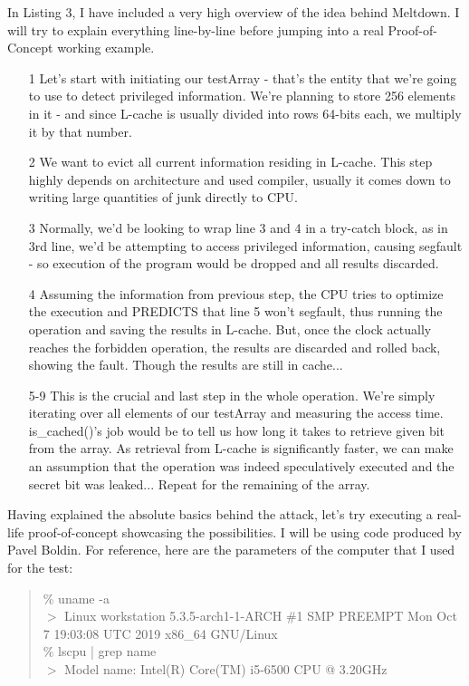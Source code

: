 \documentclass{article}
\begin{document}
In Listing 3, I have included a very high overview of the idea behind Meltdown. I will try to explain everything line-by-line before jumping into a real Proof-of-Concept working example.
\begin{enumerate}

  \item [1] Let's start with initiating our testArray - that's the entity that we're going to use to detect privileged information. We're planning to store 256 elements in it - and since L-cache is usually divided into rows 64-bits each, we multiply it by that number. 
  \item [2] We want to evict all current information residing in L-cache. This step highly depends on architecture and used compiler, usually it comes down to writing large quantities of junk directly to CPU.
  \item [3] Normally, we'd be looking to wrap line 3 and 4 in a try-catch block, as in 3rd line, we'd be attempting to access privileged information, causing segfault - so execution of the program would be dropped and all results discarded.
  \item [4] Assuming the information from previous step, the CPU tries to optimize the execution and PREDICTS that line 5 won't segfault, thus running the operation and saving the results in L-cache. But, once the clock actually reaches the forbidden operation, the results are discarded and rolled back, showing the fault. Though the results are still in cache...
  \item [5-9] This is the crucial and last step in the whole operation. We're simply iterating over all elements of our testArray and measuring the access time. is\_cached()'s job would be to tell us how long it takes to retrieve given bit from the array. As retrieval from L-cache is significantly faster, we can make an assumption that the operation was indeed speculatively executed and the secret bit was leaked... Repeat for the remaining of the array.

\end{enumerate}

Having explained the absolute basics behind the attack, let's try executing a real-life proof-of-concept showcasing the possibilities. I will be using code produced by Pavel Boldin\cite{MeltdownPOC}. For reference, here are the parameters of the computer that I used for the test:

\begin{quote}
\% uname -a 
\\ $>$ Linux workstation 5.3.5-arch1-1-ARCH \#1 SMP PREEMPT Mon Oct 7 19:03:08 UTC 2019 x86\_64 GNU/Linux 
\\ \% lscpu | grep name
\\ $>$ Model name: Intel(R) Core(TM) i5-6500 CPU @ 3.20GHz
\end{quote}
\end{document}
